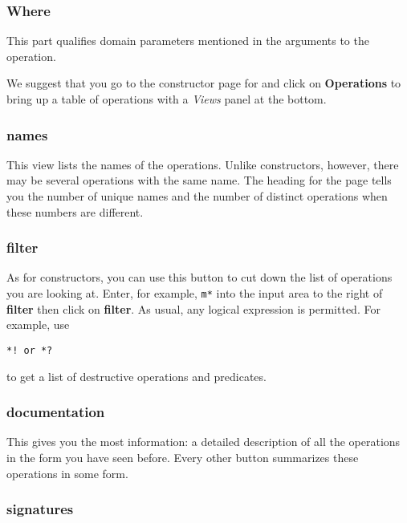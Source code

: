 {\subsubsection{Where}

This part qualifies domain parameters mentioned in the arguments to the
operation.


We suggest that you go to the constructor page for 
and click on {\bf Operations} to bring up a table of operations
with a {\it Views} panel at the bottom.

\subsubsection{names}

This view lists the names of the operations.
Unlike constructors, however, there may be several operations with the
same name.
The heading for the page tells you the number of unique names and the
number of distinct operations when these numbers are different.

\subsubsection{filter}

As for constructors, you can use this button to cut down the list of
operations you are looking at.
Enter, for example, {\tt m*} into the input area to the right of {\bf
filter} then click on {\bf filter}.
As usual, any logical expression is permitted.
For example, use
\begin{verbatim}
*! or *?
\end{verbatim}
to get a list of destructive operations and predicates.

\subsubsection{documentation}

This gives you the most information:
a detailed description of all the operations in the form you have seen
before.
Every other button summarizes these operations in some form.

\subsubsection{signatures}

}
